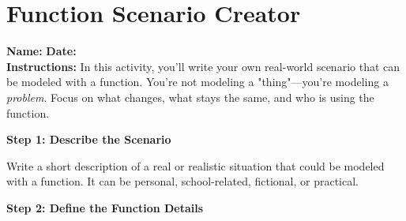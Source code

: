 \documentclass[12pt]{article}
\begin{document}
\section*{Function Scenario Creator}

\textbf{Name:} \underline{\hspace{2.5in}} \hfill \textbf{Date:} \underline{\hspace{1in}} \\

\textbf{Instructions:} In this activity, you'll write your own real-world scenario that can be modeled with a function. You're not modeling a "thing"—you're modeling a \textit{problem}. Focus on what changes, what stays the same, and who is using the function.

\vspace{1em}

\textbf{Step 1: Describe the Scenario}

Write a short description of a real or realistic situation that could be modeled with a function. It can be personal, school-related, fictional, or practical.


\vspace{2em}

\textbf{Step 2: Define the Function Details}
\end{document}
